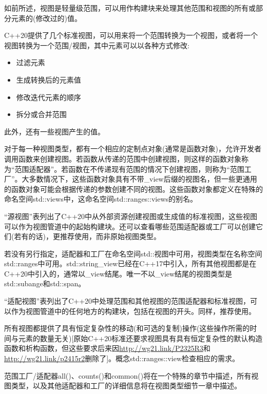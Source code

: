 
如前所述，视图是轻量级范围，可以用作构建块来处理其他范围和视图的所有或部分元素的(修改过的)值。

C++20提供了几个标准视图，可以用来将一个范围转换为一个视图，或者将一个视图转换为一个范围/视图，其中元素可以以各种方式修改:

\begin{itemize}
\item
过滤元素

\item
生成转换后的元素值

\item
修改迭代元素的顺序

\item
拆分或合并范围
\end{itemize}

此外，还有一些视图产生的值。

对于每一种视图类型，都有一个相应的定制点对象(通常是函数对象)，允许开发者调用函数来创建视图。若函数从传递的范围中创建视图，则这样的函数对象称为“范围适配器”。若函数在不传递现有范围的情况下创建视图，则称为“范围工厂”。大多数情况下，这些函数对象具有不带\_view后缀的视图名，但一些更通用的函数对象可能会根据传递的参数创建不同的视图。这些函数对象都定义在特殊的命名空间std::views中，这命名空间std::ranges::views的别名。

“源视图”表列出了C++20中从外部资源创建视图或生成值的标准视图，这些视图可以作为视图管道中的起始构建块。还可以查看哪些范围适配器或工厂可以创建它们(若有的话)，更推荐使用，而非原始视图类型。

若没有另行指定，适配器和工厂在命名空间std::视图中可用，视图类型在名称空间std::ranges中可用。std::string\_view已经在C++17中引入，所有其他视图都是在C++20中引入的，通常以\_view结尾。唯一不以\_view结尾的视图类型是std::subange和std::span。

“适配视图”表列出了C++20中处理范围和其他视图的范围适配器和标准视图，可以作为视图管道中的任何地方的构建块，包括在视图的开头。同样，推荐使用。

所有视图都提供了具有恒定复杂性的移动(和可选的复制)操作(这些操作所需的时间与元素的数量无关)[原始C++20标准还要求视图具有具有恒定复杂性的默认构造函数和析构函数，但这些要求后来因\url{http://wg21.link/P2325R3}和\url{http://wg21.link/p2415r2}删除了]。概念std::ranges::view检查相应的需求。

范围工厂/适配器all()、counts()和common()将在一个特殊的章节中描述，所有视图类型，以及其他适配器和工厂的详细信息将在视图类型细节一章中描述。

